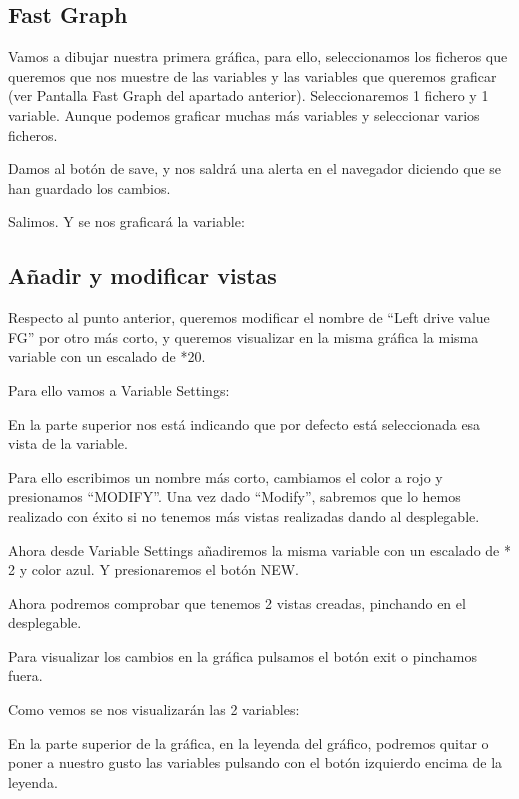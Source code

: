 \subsection{Fast Graph}
Vamos a dibujar nuestra primera gráfica, para ello, seleccionamos los ficheros que queremos que nos muestre de las variables y las variables que queremos graficar (ver Pantalla Fast Graph del apartado anterior).
Seleccionaremos 1 fichero y 1 variable. Aunque podemos graficar muchas más variables y seleccionar varios ficheros.

Damos al botón de save, y nos saldrá una alerta en el navegador diciendo que se han guardado los cambios.

Salimos. Y se nos graficará la variable:


\subsection{Añadir y modificar vistas}

Respecto al punto anterior, queremos modificar el nombre de “Left drive value FG” por otro más corto, y queremos visualizar en la misma gráfica la misma variable con un escalado de *20.

Para ello vamos a Variable Settings:

En la parte superior nos está indicando que por defecto está seleccionada esa vista de la variable.

Para ello escribimos un nombre más corto, cambiamos el color a rojo y presionamos “MODIFY”.
Una vez dado “Modify”, sabremos que lo hemos realizado con éxito si no tenemos más vistas realizadas dando al desplegable.

Ahora desde Variable Settings añadiremos la misma variable con un escalado de * 2 y color azul. Y presionaremos el botón NEW.

Ahora podremos comprobar que tenemos 2 vistas creadas, pinchando en el desplegable.

Para visualizar los cambios en la gráfica pulsamos el botón exit o pinchamos fuera.

Como vemos se nos visualizarán las 2 variables:

En la parte superior de la gráfica, en la leyenda del gráfico, podremos quitar o poner a nuestro gusto  las variables pulsando con el botón izquierdo encima de la leyenda.

